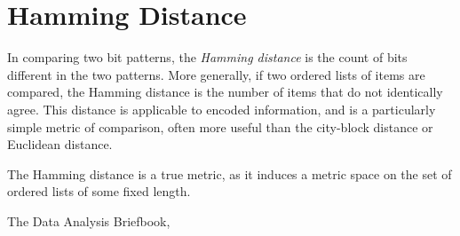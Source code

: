 \documentclass[12pt]{article}
\begin{document}

\section{Hamming Distance}

In comparing two bit patterns, the \emph{Hamming distance} is the count of bits different in the two patterns. More generally, if two ordered lists of items are compared, the Hamming distance is the number of items that do not identically agree. This distance is applicable to encoded information, and is a particularly simple metric of comparison, often more useful than the city-block distance or Euclidean distance. 

The Hamming distance is a true metric, as it induces a metric space on the set of ordered lists of some fixed length.

\begin{thebibliography}{3}

 The Data Analysis Briefbook, 

\end{thebibliography}
\end{document}
